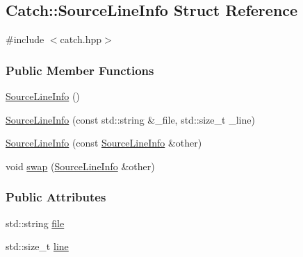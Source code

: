 \hypertarget{structCatch_1_1SourceLineInfo}{\subsection{Catch\-:\-:Source\-Line\-Info Struct Reference}
\label{structCatch_1_1SourceLineInfo}
}


{\ttfamily \#include $<$catch.\-hpp$>$}

\subsubsection*{Public Member Functions}
\begin{DoxyCompactItemize}
\item 
\hyperlink{structCatch_1_1SourceLineInfo_a9d44b2e1133794eee0bd5716424c83d6}{Source\-Line\-Info} ()
\item 
\hyperlink{structCatch_1_1SourceLineInfo_a297fe8e63a05a294379ee2ffe2220d8d}{Source\-Line\-Info} (const std\-::string \&\-\_\-file, std\-::size\-\_\-t \-\_\-line)
\item 
\hyperlink{structCatch_1_1SourceLineInfo_a6d304e2b0672e7465ef89ad9132b2735}{Source\-Line\-Info} (const \hyperlink{structCatch_1_1SourceLineInfo}{Source\-Line\-Info} \&other)
\item 
void \hyperlink{structCatch_1_1SourceLineInfo_a7386c5b52cd1d5ad11c2e7706331e7c2}{swap} (\hyperlink{structCatch_1_1SourceLineInfo}{Source\-Line\-Info} \&other)
\end{DoxyCompactItemize}
\subsubsection*{Public Attributes}
\begin{DoxyCompactItemize}
\item 
std\-::string \hyperlink{structCatch_1_1SourceLineInfo_adf3ccf0c2bd326eb3466318af82a94dd}{file}
\item 
std\-::size\-\_\-t \hyperlink{structCatch_1_1SourceLineInfo_a841e5d696c7b9cde24e45e61dd979c77}{line}
\end{DoxyCompactItemize}


